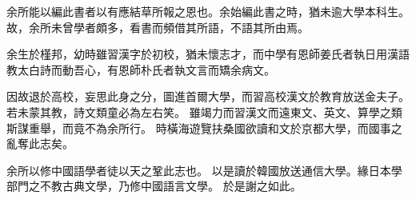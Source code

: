 余所能以編此書者以有應結草所報之恩也。余始編此書之時，猶未逾大學本科生。故，余所未曾學者頗多，看書而頻借其所語，不語其所由焉。

余生於槿邦，幼時雖習漢字於初校，猶未懷志才，而中學有恩師姜氏者執日用漢語教太白詩而動吾心，有恩師朴氏者執文言而矯余病文。

因故退於高校，妄思此身之分，圖進首爾大學，而習高校漢文於教育放送金夫子。若未蒙其教，詩文類童必為左右笑。
雖竭力而習漢文而遠東文、英文、算學之類斯謀重舉，而竟不為余所行。
時橫海遊覽扶桑國欲讀和文於京都大學，而國事之亂奪此志矣。

余所以修中國語學者徒以天之鞏此志也。
以是讀於韓國放送通信大學。緣日本學部門之不教古典文學，乃修中國語言文學。
於是謝之如此。